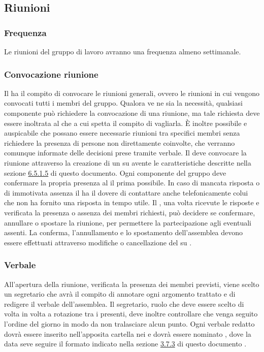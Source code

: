 \documentclass[12pt,a4paper]{article}
\begin{document}
\subsection{Riunioni}
\subsubsection{Frequenza}
Le riunioni del gruppo di lavoro avranno una frequenza almeno settimanale.

\subsubsection{Convocazione riunione}
Il \PM{} ha il compito di convocare le riunioni generali, ovvero le riunioni in cui vengono convocati tutti i membri del gruppo.
Qualora ve ne sia la necessità, qualsiasi componente può richiedere la convocazione di una riunione, ma tale richiesta deve essere inoltrata al \PM{} che a cui spetta il compito di vagliarla. È inoltre possibile e auspicabile che possano essere necessarie riunioni tra specifici membri senza richiedere la presenza di persone non direttamente coinvolte, che verranno comunque informate delle decisioni prese tramite verbale.
Il \PM{} deve convocare la riunione attraverso la creazione di un \textit{} su \textit{} avente le caratteristiche descritte nella sezione \hyperref[ticketRiunione]{6.5.1.5}
 di questo documento.
Ogni componente del gruppo deve confermare la propria presenza al \PM{} il prima possibile. 
In caso di mancata risposta o di immotivata assenza il \PM{} ha il dovere di contattare anche telefonicamente colui che non ha fornito una risposta in tempo utile. Il \PM{}, una volta ricevute le risposte e verificata la presenza o assenza dei membri richiesti, può decidere se confermare, annullare o spostare la riunione, per permettere la partecipazione agli eventuali assenti. La conferma, l'annullamento e lo spostamento dell'assemblea devono essere effettuati attraverso modifiche o cancellazione del  su \textit{}.

\subsubsection{Verbale}
All'apertura della riunione, verificata la presenza dei membri previsti, viene scelto un segretario che avrà il compito di annotare ogni argomento trattato e di redigere il verbale dell'assemblea.
Il segretario, ruolo che deve essere scelto di volta in volta a rotazione tra i presenti, deve inoltre controllare che venga seguito l'ordine del giorno in modo da non tralasciare alcun punto.
Ogni verbale redatto dovrà essere inserito nell'apposita cartella  nei \textit{} e dovrà essere nominato , dove la data seve seguire il formato indicato nella sezione \hyperref[formati]{3.7.3} di questo documento .
\end{document}
